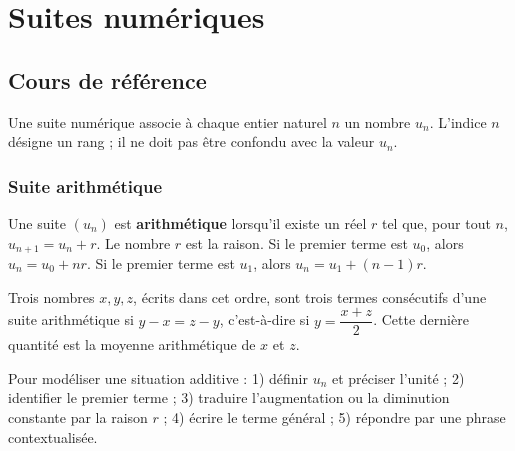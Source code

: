 
\chapter{Suites numériques}

\section{Cours de référence}
Une suite numérique associe à chaque entier naturel $n$ un nombre $u_n$. L'indice $n$ désigne un rang ; il ne doit pas être confondu avec la valeur $u_n$.

\subsection{Suite arithmétique}
\begin{retenir}
Une suite $(u_n)$ est \textbf{arithmétique} lorsqu'il existe un réel $r$ tel que, pour tout $n$, $u_{n+1}=u_n+r$. Le nombre $r$ est la raison. Si le premier terme est $u_0$, alors $u_n=u_0+nr$. Si le premier terme est $u_1$, alors $u_n=u_1+(n-1)r$.
\end{retenir}

\begin{center}
\end{center}

Trois nombres $x,y,z$, écrits dans cet ordre, sont trois termes consécutifs d'une suite arithmétique si $y-x=z-y$, c'est-à-dire si $y=\dfrac{x+z}{2}$. Cette dernière quantité est la moyenne arithmétique de $x$ et $z$.

\begin{methode}
Pour modéliser une situation additive : 1) définir $u_n$ et préciser l'unité ; 2) identifier le premier terme ; 3) traduire l'augmentation ou la diminution constante par la raison $r$ ; 4) écrire le terme général ; 5) répondre par une phrase contextualisée.
\end{methode}

